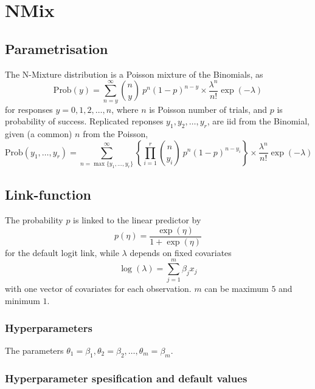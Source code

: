 \documentclass[a4paper,11pt]{article}
\def\mmax{5}
\begin{document}
\section*{NMix}

\subsection*{Parametrisation}

The N-Mixture distribution is a Poisson mixture of the Binomials, as
\begin{displaymath}
    \text{Prob}(y) = \sum_{n=y}^{\infty} {n \choose y} \ p^n
    (1-p)^{n-y} \times \frac{\lambda^{n}}{n!}\exp(-\lambda)
\end{displaymath}
for responses $y=0, 1, 2, \ldots,n$, where $n$ is Poisson number of
trials, and $p$ is probability of success. Replicated reponses
$y_1, y_2, \ldots, y_r$, are iid from the Binomial, given (a common)
$n$ from the Poisson,
\begin{displaymath}
    \text{Prob}(y_1, \ldots, y_r) = \sum_{n=\max\{y_1, \ldots,
        y_r\}}^{\infty} \left\{\prod_{i=1}^{r}
    {n \choose y_i} \ p^n
    (1-p)^{n-y_i}\right\} \times \frac{\lambda^{n}}{n!}\exp(-\lambda)
\end{displaymath}

\subsection*{Link-function}

The probability $p$ is linked to the linear predictor by
\begin{displaymath}
    p(\eta) = \frac{\exp(\eta)}{1+\exp(\eta)}
\end{displaymath}
for the default logit link, while $\lambda$ depends on fixed
covariates
\begin{displaymath}
    \log(\lambda) = \sum_{j=1}^{m} \beta_j x_j
\end{displaymath}
with one vector of covariates for each observation. $m$ can be maximum
$\mmax$ and minimum $1$.

\subsubsection*{Hyperparameters}
The parameters
$\theta_1=\beta_1, \theta_2=\beta_2, \ldots, \theta_m=\beta_m$.

\subsubsection*{Hyperparameter spesification and default values}

\end{document}
